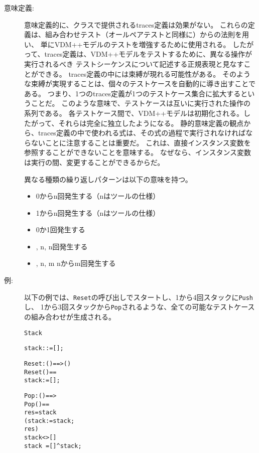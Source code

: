 \documentclass[\pformat,12pt]{jarticle}
\begin{document}
\begin{description}
\item[意味定義:] 
意味定義的に、クラスで提供されるtraces定義は効果がない。
これらの定義は、組み合わせテスト（オールペアテストと同様に）からの法則を用い、
単にVDM++モデルのテストを増強するために使用される。
したがって、traces定義は、VDM++モデルをテストするために、異なる操作が実行されるべき
テストシーケンスについて記述する正規表現と見なすことができる。
traces定義の中には束縛が現れる可能性がある。
そのような束縛が実現することは、個々のテストケースを自動的に導き出すことである。
つまり、1つのtraces定義が1つのテストケース集合に拡大するということだ。
このような意味で、テストケースは互いに実行された操作の系列である。
各テストケース間で、VDM++モデルは初期化される。したがって、それらは完全に独立したようになる。
静的意味定義の観点から、traces定義の中で使われる式は、その式の過程で実行されなければならないことに注意することは重要だ。
これは、直接インスタンス変数を参照することができないことを意味する。
なぜなら、インスタンス変数は実行の間、変更することができるからだ。

異なる種類の繰り返しパターンは以下の意味を持つ。
\begin{itemize}
\item  \Lit{*} 0からn回発生する（nはツールの仕様）
\item  \Lit{+} 1からn回発生する（nはツールの仕様）
\item  {} 0か1回発生する
\item  \Lit{\{}, n, \Lit{\}} n回発生する
\item  \Lit{\{}, n, \Lit{,} m \Lit{\}} nからm回発生する
\end{itemize}

\item[例:] 
以下の例では、\texttt{Reset}の呼び出しでスタートし、1から4回スタックに\texttt{Push}し、
1から3回スタックから\texttt{Pop}されるような、全ての可能なテストケースの組み合わせが生成される。

\begin{alltt}
 Stack

    stack :  := [];


     Reset : () ==> ()
    Reset () ==
      stack := [];

     Pop : () ==> 
    Pop() ==
       res =  stack 
        (stack :=  stack;
          res)
     stack <> []
     stack~ = [] ^ stack;


\end{alltt}
\end{description}
\end{document}
